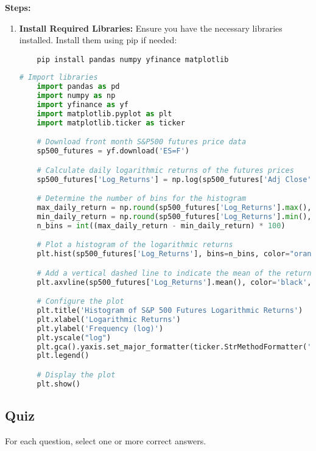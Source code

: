 \documentclass{article}
\begin{document}
\textbf{Steps:}
\begin{enumerate}
    \item \textbf{Install Required Libraries:} Ensure you have the necessary libraries installed. Install them using pip if needed:
    \begin{verbatim}
    pip install pandas numpy yfinance matplotlib
    \end{verbatim}

    \begin{lstlisting}[language=Python]
    # Import libraries
    import pandas as pd
    import numpy as np
    import yfinance as yf
    import matplotlib.pyplot as plt
    import matplotlib.ticker as ticker

    # Download front month S&P500 futures price data
    sp500_futures = yf.download('ES=F')

    # Calculate daily logarithmic returns of the futures prices
    sp500_futures['Log_Returns'] = np.log(sp500_futures['Adj Close']).diff()

    # Determine the number of bins for the histogram
    max_daily_return = np.round(sp500_futures['Log_Returns'].max(), 2)
    min_daily_return = np.round(sp500_futures['Log_Returns'].min(), 2)
    n_bins = int((max_daily_return - min_daily_return) * 100)

    # Plot a histogram of the logarithmic returns
    plt.hist(sp500_futures['Log_Returns'], bins=n_bins, color="orange", label="Return Distribution")

    # Add a vertical dashed line to indicate the mean of the returns
    plt.axvline(sp500_futures['Log_Returns'].mean(), color='black', linestyle='dashed', linewidth=2, label="Daily Mean Return")

    # Configure the plot
    plt.title('Histogram of S&P 500 Futures Logarithmic Returns')
    plt.xlabel('Logarithmic Returns')
    plt.ylabel('Frequency (log)')
    plt.yscale("log")
    plt.gca().yaxis.set_major_formatter(ticker.StrMethodFormatter('{x:,.0f}'))  # Format y-axis labels as integers
    plt.legend()

    # Display the plot
    plt.show()
    \end{lstlisting}
\end{enumerate}


\subsection{Quiz}
For each question, select one or more correct answers.
\end{document}
